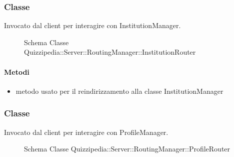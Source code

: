\subsubsection{Classe }
Invocato dal client per interagire con InstitutionManager.
\begin{figure}[H]
\centering
\noindent{}
\caption[Schema Classe InstitutionRouter]{Schema Classe Quizzipedia::Server::RoutingManager::InstitutionRouter}
\end{figure}
\paragraph{Metodi}
\begin{itemize}
\item {}
\newline
metodo usato per il reindirizzamento alla classe InstitutionManager
\newline
\end{itemize}
\subsubsection{Classe }
Invocato dal client per interagire con ProfileManager.
\begin{figure}[H]
\centering
\noindent{}
\caption[Schema Classe ProfileRouter]{Schema Classe Quizzipedia::Server::RoutingManager::ProfileRouter}
\end{figure}
